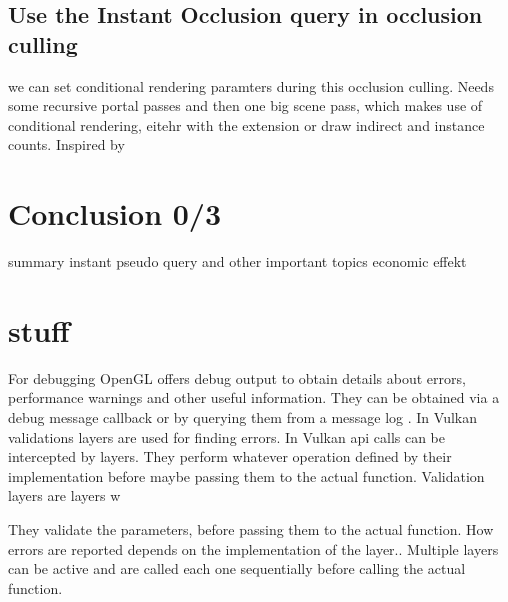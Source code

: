 \subsection{Use the Instant Occlusion query in occlusion culling}
we can set conditional rendering paramters during this occlusion culling.
Needs some  recursive portal passes and then one big scene pass, which makes use of conditional rendering, eitehr with the extension or draw indirect and instance counts. Inspired by \cite{yang:2014:walkthrough}

\section{Conclusion 0/3}

summary
instant pseudo query and other important topics
economic effekt

\section*{stuff}
For debugging OpenGL offers debug output to obtain details about errors, performance warnings and other useful information. They can be obtained via a debug message callback or by querying them from a message log \cite{khronos:openGL:spec4.6}. In Vulkan validations layers are used for finding errors. In Vulkan \gls{api} calls can be intercepted by layers. They perform whatever operation defined by their implementation before maybe passing them to the actual function. Validation layers are layers w

They validate the parameters, before passing them to the actual function. How errors are reported depends on the implementation of the layer.. Multiple layers can be active and are called each one sequentially before calling the actual function. \cite{khronos:vulkan:spec1.1}












